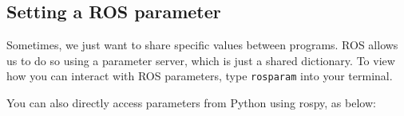 











\subsection{Setting a ROS parameter}
Sometimes, we just want to share specific values between programs. ROS allows us to do so using a parameter server, which is just a shared dictionary. To view how you can interact with ROS parameters, type \texttt{rosparam} into your terminal.

You can also directly access parameters from Python using rospy, as below:

